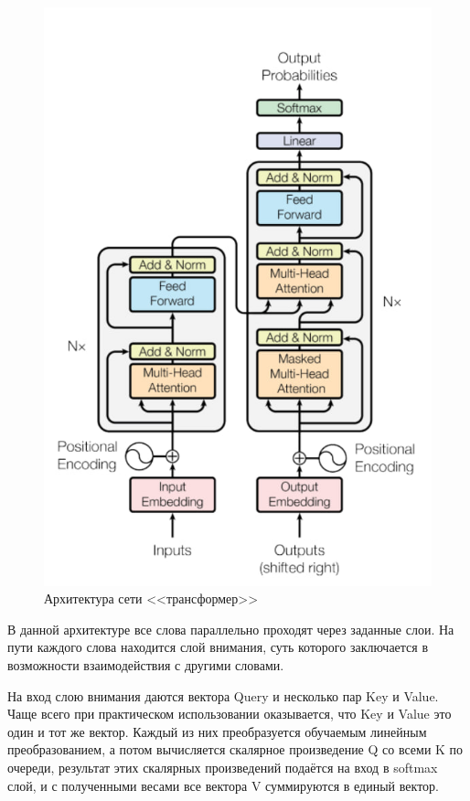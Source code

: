 \begin{figure}[ht!] 
	\center
	\includegraphics [scale=0.6] {my_folder/images/transformer}
	\caption{Архитектура сети <<трансформер>>} 
	\label{fig:transformer}
\end{figure}

В данной архитектуре все слова параллельно проходят через заданные слои. На пути каждого слова находится слой внимания, суть которого заключается в возможности взаимодействия с другими словами.

На вход слою внимания даются вектора Query и несколько пар Key и Value.  Чаще всего при практическом использовании оказывается, что  Key и Value это один и тот же вектор. Каждый из них преобразуется обучаемым линейным преобразованием, а потом вычисляется скалярное произведение Q со всеми K по очереди, результат этих скалярных произведений подаётся на вход в softmax слой, и с полученными весами все вектора V суммируются в единый вектор. 


